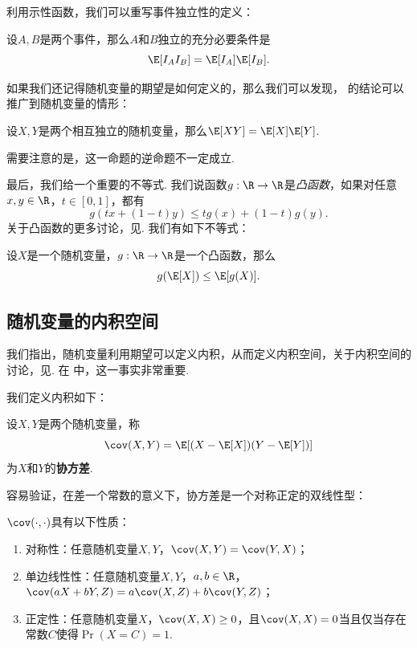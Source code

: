 利用示性函数，我们可以重写事件独立性的定义：

\begin{proposition}\label{prop:independent-expectation}
设$A,B$是两个事件，那么$A$和$B$独立的充分必要条件是
\[\E[I_AI_B]=\E[I_A]\E[I_B].\]
\end{proposition}

如果我们还记得随机变量的期望是如何定义的，那么我们可以发现， 的结论可以推广到随机变量的情形：

\begin{theorem}\label{thm:independent-expectation-2}
设$X,Y$是两个相互独立的随机变量，那么$\E[XY]=\E[X]\E[Y]$. 
\end{theorem}

需要注意的是，这一命题的逆命题不一定成立. 

最后，我们给一个重要的不等式. 我们说函数$g:\R\to\R$是\emph{凸函数}，如果对任意$x,y\in\R$，$t\in[0,1]$，都有
\[g(tx+(1-t)y)\leq tg(x)+(1-t)g(y).\]
关于凸函数的更多讨论，见. 我们有如下不等式：

\begin{theorem}[Jensen不等式]\label{thm:jensen}
设$X$是一个随机变量，$g:\R\to\R$是一个凸函数，那么
\[g(\E[X])\leq \E[g(X)].\]
\end{theorem}

\subsection{随机变量的内积空间}\label{subsec:inner-product}

我们指出，随机变量利用期望可以定义内积，从而定义内积空间，关于内积空间的讨论，见. 在 中，这一事实非常重要. 

我们定义内积如下：

\begin{definition}[协方差] 
设$X,Y$是两个随机变量，称
\[\cov(X,Y)=\E[(X-\E[X])(Y-\E[Y])]\]
为$X$和$Y$的\textbf{协方差}. 
\end{definition}

容易验证，在差一个常数的意义下，协方差是一个对称正定的双线性型：

\begin{proposition}\label{prop:covariance-inner-product}
$\cov(\cdot,\cdot)$具有以下性质：
\begin{enumerate}
    \item 对称性：任意随机变量$X,Y$，$\cov(X,Y)=\cov(Y,X)$；
    \item 单边线性性：任意随机变量$X,Y$，$a,b\in\R$，$\cov(aX+bY,Z)=a\cov(X,Z)+b\cov(Y,Z)$；
    \item 正定性：任意随机变量$X$，$\cov(X,X)\geq 0$，且$\cov(X,X)=0$当且仅当存在常数$C$使得$\Pr(X=C)=1$.
\end{enumerate}
\end{proposition}

